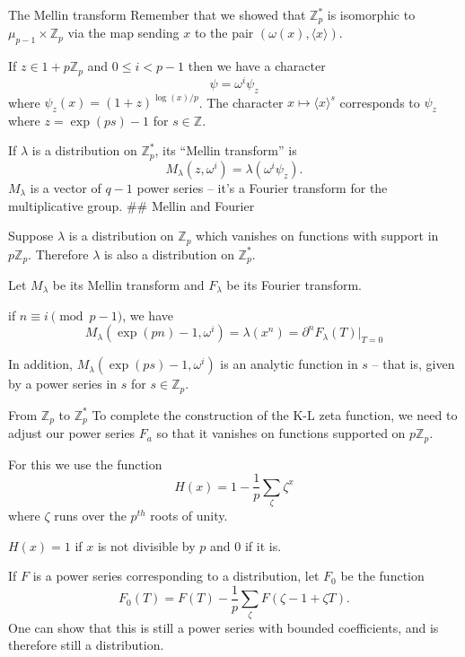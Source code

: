 \documentclass[
  ignorenonframetext,
]{beamer}
\begin{document}
\begin{frame}{The Mellin transform}
\protect\hypertarget{the-mellin-transform}{}
Remember that we showed that \(\mathbb{Z}_p^{*}\) is isomorphic to
\(\mu_{p-1}\times\mathbb{Z}_p\) via the map sending \(x\) to the pair
\((\omega(x),\langle x\rangle)\).

If \(z\in 1+p\mathbb{Z}_p\) and \(0\le i<p-1\) then we have a character
\[
\psi = \omega^{i}\psi_z
\] where \(\psi_z(x) = (1+z)^{\log(x)/p}\). The character
\(x\mapsto \langle x\rangle^{s}\) corresponds to \(\psi_z\) where
\(z=\exp(ps)-1\) for \(s\in\mathbb{Z}\).

If \(\lambda\) is a distribution on \(\mathbb{Z}_p^{*}\), its ``Mellin
transform'' is \[
M_{\lambda}(z,\omega^i)=\lambda(\omega^i\psi_z).
\] \(M_{\lambda}\) is a vector of \(q-1\) power series -- it's a Fourier
transform for the multiplicative group. \#\# Mellin and Fourier

Suppose \(\lambda\) is a distribution on \(\mathbb{Z}_p\) which vanishes
on functions with support in \(p\mathbb{Z}_p\). Therefore \(\lambda\) is
also a distribution on \(\mathbb{Z}_p^{*}\).

Let \(M_{\lambda}\) be its Mellin transform and \(F_{\lambda}\) be its
Fourier transform.

if \(n\equiv i\pmod{p-1}\), we have \[
M_{\lambda}(\exp(pn)-1,\omega^{i})=\lambda(x^n)=\partial^{n}F_{\lambda}(T)|_{T=0}
\]

In addition, \(M_{\lambda}(\exp(ps)-1,\omega^{i})\) is an analytic
function in \(s\) -- that is, given by a power series in \(s\) for
\(s\in\mathbb{Z}_p\).
\end{frame}

\begin{frame}{From \(\mathbb{Z}_p\) to \(\mathbb{Z}_p^{*}\)}
\protect\hypertarget{from-mathbbz_p-to-mathbbz_p}{}
To complete the construction of the K-L zeta function, we need to adjust
our power series \(F_a\) so that it vanishes on functions supported on
\(p\mathbb{Z}_p\).

For this we use the function \[
H(x) = 1-\frac{1}{p}\sum_{\zeta} \zeta^x
\] where \(\zeta\) runs over the \(p^{th}\) roots of unity.

\(H(x)=1\) if \(x\) is not divisible by \(p\) and \(0\) if it is.

If \(F\) is a power series corresponding to a distribution, let
\(F_{0}\) be the function \[
F_0(T) = F(T)-\frac{1}{p}\sum_{\zeta}F(\zeta-1+\zeta T).  
\] One can show that this is still a power series with bounded
coefficients, and is therefore still a distribution.
\end{frame}
\end{document}
